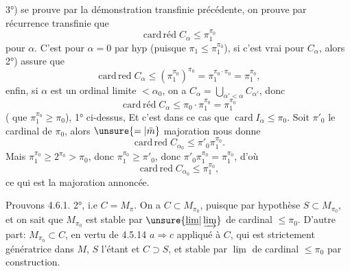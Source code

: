  3°) se prouve par la démonstration  transfinie précédente,  on prouve par récurrence transfinie que
\[
\operatorname{card\,réd}C_\alpha\leq\pi_1^{\pi_0}
\]
pour  $\alpha$. C'est  pour $\alpha=0$ par hyp (puisque $\pi_1\leq\pi_1^{\pi_0}$),  si c'est vrai pour $C_\alpha$, alors 2°) assure que
\[
\operatorname{card\,red}C_\alpha\leq(\pi_1^{\pi_0})^{\pi_0}=\pi_1^{\pi_0\cdot\pi_0}=\pi_1^{\pi_0},
\]
enfin, si $\alpha$ est un ordinal limite $<\alpha_0$, on a $C_\alpha=\bigcup_{\alpha'<\alpha}C_{\alpha'}$, donc
\[
\operatorname{card\,réd}C_\alpha\leq\pi_0\cdot\pi_1^{\pi_0}=\pi_1^{\pi_0}
\]
( que $\pi_1^{\pi_0}\geq\pi_0$),    1° ci-dessus, Et c'est dans ce cas que $\operatorname{card}I_\alpha\leq\pi_0$. Soit $\pi'_0$ le cardinal  de $\pi_0$, alors  $\unsure{=|\bar m}$ majoration nous donne
\[
\operatorname{card\,red}C_{\alpha_0}\leq\pi'_0\pi_1^{\pi_0}.
\]
Mais  $\pi_1^{\pi_0}\geq 2^{\pi_0}>\pi_0$, donc $\pi_1^{\pi_0}\geq\pi'_0$, donc $\pi'_0\pi_1^{\pi_0}=\pi_1^{\pi_0}$, d'où
\[
\operatorname{card\,red}C_{\alpha_0}\leq\pi_1^{\pi_0},
\]
ce qui est la majoration annoncée.

Prouvons 4.6.1. 2°, i.e $C=M_\pi$. On a $C\subset M_{\pi_0}$, puisque par hypothèse $S\subset M_{\pi_0}$, et on sait que $M_{\pi_0}$ est stable par $\unsure{\underline{\lim}|\varinjlim}$ de cardinal $\leq\pi_0$. D'autre part: $M_{\pi_0}\subset C$, en vertu de 4.5.14 $a\Rightarrow c$ appliqué à $C$, qui est strictement génératrice dans $M$, $S$ l'étant et $C\supset S$, et stable par $\underline{\lim}$ de cardinal $\leq\pi_0$ par construction.

